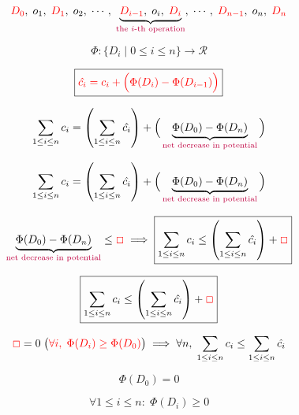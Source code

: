 
\begin{frame}{}
  \centerline{}
\end{frame}

\begin{frame}{}
  \[
    \textcolor{red}{D_0},\; o_1,\; \textcolor{red}{D_1},\; o_2,\; \cdots,\; \underbrace{\textcolor{red}{D_{i-1}},\; o_{i},\; \textcolor{red}{D_{i}}}_{\text{\textcolor{purple}{the $i$-th operation}}},\; 
    \cdots,\; \textcolor{red}{D_{n-1}},\; o_{n},\; \textcolor{red}{D_{n}}
  \]

  \pause
  \vspace{0.50cm}
  \[
    \Phi: \Big\{D_{i} \mid 0 \le i \le n\Big\} \to \mathcal{R}
  \]

  \pause
  \vspace{0.30cm}
  \[
    \boxed{\textcolor{red}{\hat{c_i} = c_i + \Big(\Phi(D_{i}) - \Phi(D_{i-1})\Big)}}
  \]

  \pause
  \vspace{0.50cm}
  \[
    \sum_{1 \le i \le n} c_i = \left( \sum_{1 \le i \le n} \hat{c_i} \right) 
      + \Big(\underbrace{\Phi(D_{0}) - \Phi(D_{n})}_{\text{\textcolor{purple}{net decrease in potential}}} \Big)
  \]
\end{frame}

\begin{frame}{}
  \[
    \sum_{1 \le i \le n} c_i = \left( \sum_{1 \le i \le n} \hat{c_i} \right) 
      + \Big(\underbrace{\Phi(D_{0}) - \Phi(D_{n})}_{\text{\textcolor{purple}{net decrease in potential}}} \Big)
  \]

  \pause
  \vspace{0.80cm}
  \[
    \underbrace{\Phi(D_{0}) - \Phi(D_{n})}_{\text{\textcolor{purple}{net decrease in potential}}} \le \textcolor{red}{\Box}
    \implies
    \boxed{\sum_{1 \le i \le n} c_i \le \left( \sum_{1 \le i \le n} \hat{c_i} \right) + \textcolor{red}{\Box}}
  \]
\end{frame}

\begin{frame}
  \[
    \boxed{\sum_{1 \le i \le n} c_i \le \left( \sum_{1 \le i \le n} \hat{c_i} \right) + \textcolor{red}{\Box}}
  \]

  \pause
  \vspace{0.50cm}
  \[
    \textcolor{red}{\Box} = 0 \;\big(\textcolor{red}{\forall i,\; \Phi(D_i) \ge \Phi(D_0)}\big)
    \implies 
    \forall n,\; \sum_{1 \le i \le n} c_i \le \sum_{1 \le i \le n} \hat{c_i}
  \]

  \pause
  \vspace{0.50cm}
  \[
    \Phi(D_{0}) = 0
  \]

  \[
    \forall 1 \le i \le n:\; \Phi(D_{i}) \ge 0
  \]
\end{frame}
